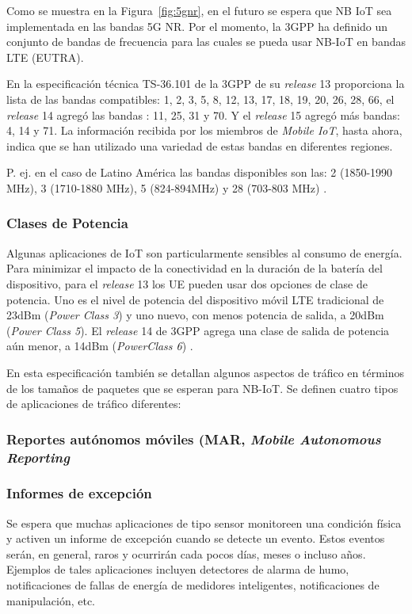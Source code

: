 Como se muestra en la Figura~\ref{fig:5gnr}, en el futuro se espera que NB IoT sea implementada en las bandas 5G NR. Por el momento, la 3GPP ha definido un conjunto de bandas de frecuencia para las cuales se pueda usar NB-IoT en bandas LTE (EUTRA). \newline

En la especificación técnica TS-36.101 de la 3GPP de su \textit{release} 13 proporciona la lista de las bandas compatibles: 1, 2, 3, 5, 8, 12, 13, 17, 18, 19, 20, 26, 28, 66, el \textit{release} 14 agregó las bandas : 11, 25, 31 y 70. Y el \textit{release} 15 agregó más bandas: 4, 14 y 71. La información recibida por los miembros de \textit{Mobile IoT}, hasta ahora, indica que se han utilizado una variedad de estas bandas en diferentes regiones\parencite{NBIoTDeploymentGSMA}.\newline

P. ej. en el caso de Latino América las bandas disponibles son las: 2 (1850-1990 MHz), 3 (1710-1880 MHz), 5 (824-894MHz) y 28 (703-803 MHz) \parencite{NBIoTDeploymentGSMA}.\newline

\subsubsection{Clases de Potencia}

Algunas aplicaciones de IoT son particularmente sensibles al consumo de energía. Para minimizar el impacto de la conectividad en la duración de la batería del dispositivo, para el \textit{release} 13 los UE pueden usar dos opciones de clase de potencia. Uno es el nivel de potencia del dispositivo móvil LTE tradicional de 23dBm (\textit{Power Class 3}) y uno nuevo, con menos potencia de salida, a 20dBm (\textit{Power Class 5}). El \textit{release} 14 de 3GPP agrega una clase de salida de potencia aún menor, a 14dBm (\textit{PowerClass 6}) \parencite{NBIoTDeploymentGSMA}.

En esta especificación también se detallan algunos aspectos de tráfico en términos de los tamaños de paquetes que se esperan para NB-IoT. Se definen cuatro tipos de aplicaciones de tráfico diferentes:

\subsubsection{Reportes autónomos móviles (MAR, \textit{Mobile Autonomous Reporting}}
\subsubsection{Informes de excepción}
Se espera que muchas aplicaciones de tipo sensor monitoreen una condición física y activen un informe de excepción cuando se detecte un evento. Estos eventos serán, en general, raros y ocurrirán cada pocos días, meses o incluso años. Ejemplos de tales aplicaciones incluyen detectores de alarma de humo, notificaciones de fallas de energía de medidores inteligentes, notificaciones de manipulación, etc.\newline

